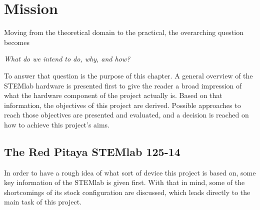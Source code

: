%
%
\chapter{Mission} %
\label{ch:mission}
%
%

Moving from the theoretical domain  to the practical, the overarching question
becomes
\begin{center}
    \emph{What do  we intend to do, why, and how?}
\end{center}
To answer that question is the  purpose of this chapter. A general overview of
the STEMlab hardware is presented first  to give the reader a broad impression
of what  the hardware  component of  the project actually  is.  Based  on that
information, the  objectives of this project  are derived. Possible approaches
to  reach those  objectives are  presented and  evaluated, and  a decision  is
reached on how to achieve this project's aims.

%
%
\section{The Red Pitaya STEMlab 125-14} %
\label{sec:stl125}

In order to have a rough idea of what sort of device this project is based on,
some key information of the STEMlab is given first. With that in mind, some of
the  shortcomings  of  its  stock configuration  are  discussed,  which  leads
directly to the main task of this project.

%
%
